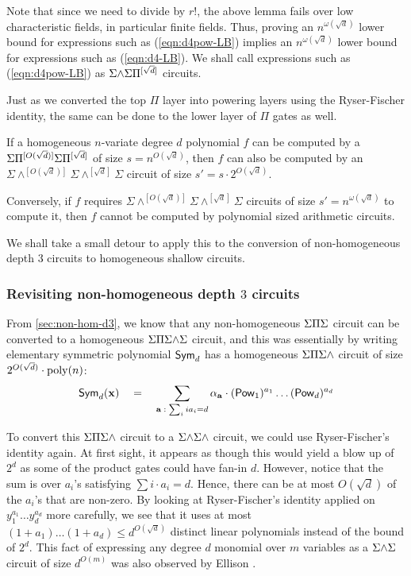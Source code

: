 Note that since we need to divide by $r!$, the above lemma fails over
low characteristic fields, in particular finite fields.
Thus, proving an $n^{\omega(\sqrt{d})}$ lower bound for expressions
such as (\ref{eqn:d4pow-LB}) implies an $n^{\omega(\sqrt{d})}$ lower
bound for expressions such as (\ref{eqn:d4-LB}).
We shall call expressions such as (\ref{eqn:d4pow-LB}) as
$\Sigma\mathord{\wedge}\Sigma\Pi^{[\sqrt{d}]}$ circuits. 

Just as we converted the top $\Pi$ layer into powering layers using
the Ryser-Fischer identity, the same can be done to the lower layer of
$\Pi$ gates as well.

\begin{corollary}\label{cor:pow-genckt}
  If a homogeneous $n$-variate degree $d$ polynomial $f$ can be
  computed by a $\Sigma\Pi^{[O(\sqrt{d})]}\Sigma\Pi^{[\sqrt{d}]}$ of size $s =
  n^{O(\sqrt{d})}$, then $f$ can also be computed by an
  $\Sigma\mathord{\wedge^{[O(\sqrt{d})]}}\Sigma\mathord{\wedge^{[\sqrt{d}]}}\Sigma$
  circuit of size $s' = s \cdot 2^{O(\sqrt{d})}$. 

  Conversely, if $f$ requires
  $\Sigma\mathord{\wedge^{[O(\sqrt{d})]}}\Sigma\mathord{\wedge^{[\sqrt{d}]}}\Sigma$
  circuits of size $s' = n^{\omega(\sqrt{d})}$ to compute it, then $f$
  cannot be computed by polynomial sized arithmetic circuits. 
\end{corollary}

We shall take a small detour to apply this to the conversion of non-homogeneous depth $3$
circuits  to homogeneous shallow circuits.

\subsubsection{Revisiting non-homogeneous depth $3$ circuits}

From \autoref{sec:non-hom-d3}, we know that any non-homogeneous $\Sigma\Pi\Sigma$
circuit can be converted to a homogeneous $\Sigma\Pi\Sigma\mathord{\wedge}\Sigma$ circuit, and
this was essentially by writing elementary symmetric polynomial
$\mathsf{Sym}_d$ has a homogeneous $\Sigma\Pi\Sigma\mathord{\wedge}$ circuit of size $2^{O(\sqrt{d})}
\cdot \mathrm{poly}(n)$:
\[
\mathsf{Sym}_d(\mathbf{x}) \quad = \quad \sum_{\mathbf{a}\;:\; \sum_i ia_i = d} \alpha_{\mathbf{a}} \cdot (\mathsf{Pow}_1)^{a_1}\dots (\mathsf{Pow}_d)^{a_d}
\]

To convert this $\Sigma\Pi\Sigma\mathord{\wedge}$ circuit to a
$\Sigma\mathord{\wedge}\Sigma\mathord{\wedge}$ circuit, we could use
Ryser-Fischer's identity again.
At first sight, it appears as though this would yield a blow up of
$2^d$ as some of the product gates could have fan-in $d$.
However, notice that the sum is over $a_i$'s satisfying $\sum i\cdot
a_i = d$.
Hence, there can be at most $O(\sqrt{d})$ of the $a_i$'s that are
non-zero.
By looking at Ryser-Fischer's identity applied on $y_1^{a_1}\dots
y_{d}^{a_d}$ more carefully, we see that it uses at most $(1+a_1)\dots
(1+a_d) \leq d^{O(\sqrt{d})}$ distinct linear polynomials instead of the
\naive bound of $2^{d}$.
This fact of expressing any degree $d$ monomial over $m$ variables as
a $\Sigma\mathord{\wedge}\Sigma$ circuit of size $d^{O(m)}$ was also observed
by Ellison \cite{ellison}. 

